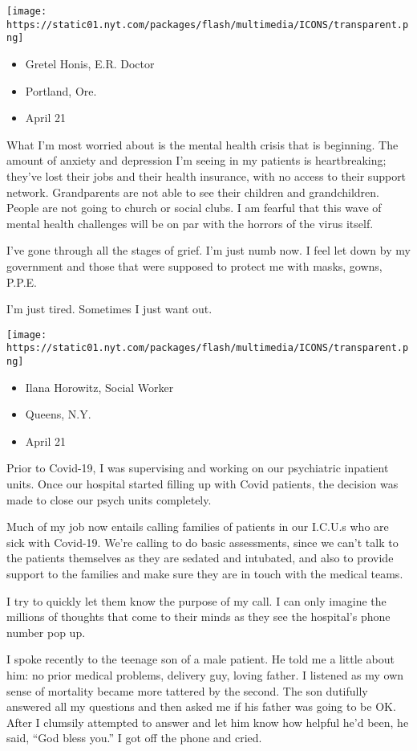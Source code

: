 \texttt{[image: https://static01.nyt.com/packages/flash/multimedia/ICONS/transparent.png]}

\begin{itemize}
\tightlist
\item
  Gretel Honis, E.R. Doctor
\item
  Portland, Ore.
\item
  April 21
\end{itemize}

What I'm most worried about is the mental health crisis that is
beginning. The amount of anxiety and depression I'm seeing in my
patients is heartbreaking; they've lost their jobs and their health
insurance, with no access to their support network. Grandparents are not
able to see their children and grandchildren. People are not going to
church or social clubs. I am fearful that this wave of mental health
challenges will be on par with the horrors of the virus itself.

I've gone through all the stages of grief. I'm just numb now. I feel let
down by my government and those that were supposed to protect me with
masks, gowns, P.P.E.

I'm just tired. Sometimes I just want out.

\texttt{[image: https://static01.nyt.com/packages/flash/multimedia/ICONS/transparent.png]}

\begin{itemize}
\tightlist
\item
  Ilana Horowitz, Social Worker
\item
  Queens, N.Y.
\item
  April 21
\end{itemize}

Prior to Covid-19, I was supervising and working on our psychiatric
inpatient units. Once our hospital started filling up with Covid
patients, the decision was made to close our psych units completely.

Much of my job now entails calling families of patients in our I.C.U.s
who are sick with Covid-19. We're calling to do basic assessments, since
we can't talk to the patients themselves as they are sedated and
intubated, and also to provide support to the families and make sure
they are in touch with the medical teams.

I try to quickly let them know the purpose of my call. I can only
imagine the millions of thoughts that come to their minds as they see
the hospital's phone number pop up.

I spoke recently to the teenage son of a male patient. He told me a
little about him: no prior medical problems, delivery guy, loving
father. I listened as my own sense of mortality became more tattered by
the second. The son dutifully answered all my questions and then asked
me if his father was going to be OK. After I clumsily attempted to
answer and let him know how helpful he'd been, he said, ``God bless
you.'' I got off the phone and cried.


